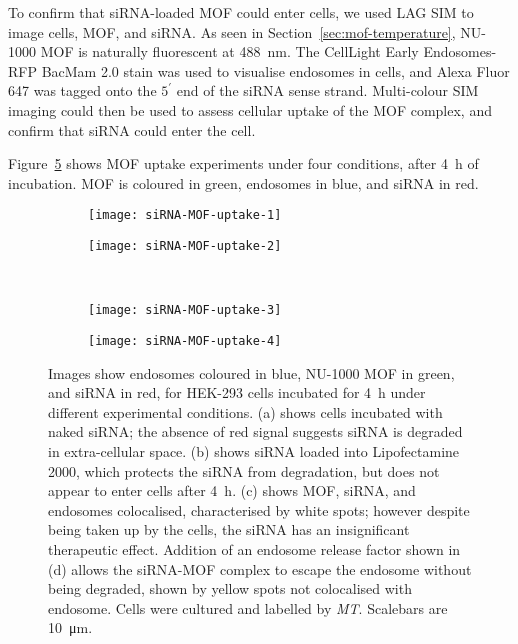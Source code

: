 To confirm that siRNA-loaded MOF could enter cells, we used LAG SIM to image cells, MOF, and siRNA.
As seen in Section~\ref{sec:mof-temperature}, NU-1000 MOF is naturally fluorescent at \SI{488}{\nano\metre}.
The CellLight Early Endosomes-RFP BacMam 2.0 stain was used to visualise endosomes in cells, and Alexa Fluor 647 was tagged onto the $5^\prime$ end of the siRNA sense strand.
Multi-colour SIM imaging could then be used to assess cellular uptake of the MOF complex, and confirm that siRNA could enter the cell.

Figure~\ref{fig:siRNA-MOF-uptake} shows MOF uptake experiments under four conditions, after \SI{4}{\hour} of incubation.
MOF is coloured in green, endosomes in blue, and siRNA in red.


\begin{figure}[tbp]
\centering
\begin{subfigure}[b]{0.49\textwidth}
	\texttt{[image: siRNA-MOF-uptake-1]}
	\caption{}\label{fig:siRNA-MOF-uptake-1}
\end{subfigure}
\hfill
\begin{subfigure}[b]{0.49\textwidth}
	\texttt{[image: siRNA-MOF-uptake-2]}
	\caption{}\label{fig:siRNA-MOF-uptake-2}
\end{subfigure}

~\newline
\begin{subfigure}[b]{0.49\textwidth}
	\texttt{[image: siRNA-MOF-uptake-3]}
	\caption{}\label{fig:siRNA-MOF-uptake-3}
\end{subfigure}
\hfill
\begin{subfigure}[b]{0.49\textwidth}
	\texttt{[image: siRNA-MOF-uptake-4]}
	\caption{}\label{fig:siRNA-MOF-uptake-4}
\end{subfigure}
\caption[MOFs: siRNA-loaded NU-1000 is endocytosed by HEK-293 cells, and released to the cytoplasm with an endosome release factor]{Images show endosomes coloured in blue, NU-1000 MOF in green, and siRNA in red, for HEK-293 cells incubated for \SI{4}{\hour} under different experimental conditions. (a) shows cells incubated with naked siRNA; the absence of red signal suggests siRNA is degraded in extra-cellular space. (b) shows siRNA loaded into Lipofectamine 2000, which protects the siRNA from degradation, but does not appear to enter cells after \SI{4}{\hour}. (c) shows MOF, siRNA, and endosomes colocalised, characterised by white spots; however despite being taken up by the cells, the siRNA has an insignificant therapeutic effect. Addition of an endosome release factor shown in (d) allows the siRNA-MOF complex to escape the endosome without being degraded, shown by yellow spots not colocalised with endosome. Cells were cultured and labelled by \textit{MT}. Scalebars are \SI{10}{\micro\metre}. }
\label{fig:siRNA-MOF-uptake}
\end{figure}

